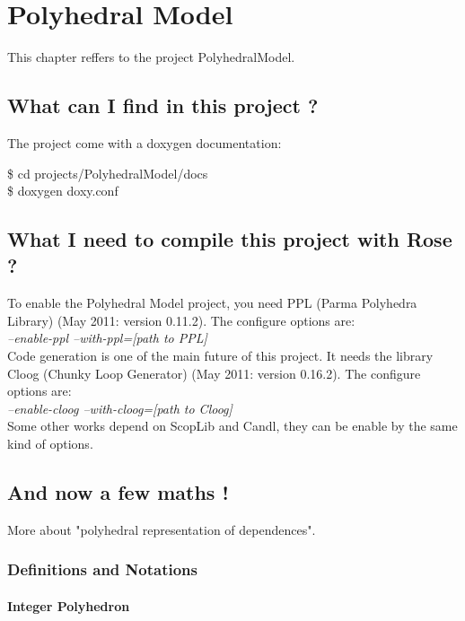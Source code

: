 \chapter{Polyhedral Model}
\label{polyhedric:polyhedric}

	This chapter reffers to the project PolyhedralModel.

	\section{What can I find in this project ?}
	\label{polyhedric:insideproject}
	
	The project come with a doxygen documentation:
	
	\$ cd projects/PolyhedralModel/docs \\
	\$ doxygen doxy.conf
	
	\section{What I need to compile this project with Rose ?}
	\label{polyhedric:getstarted}

	To enable the Polyhedral Model project, you need PPL (Parma Polyhedra Library) (May 2011: version 0.11.2). The configure options are: \\
	\emph{--enable-ppl --with-ppl=[path to PPL]}\\
	
	Code generation is one of the main future of this project. It needs the library Cloog (Chunky Loop Generator) (May 2011: version 0.16.2). The configure options are: \\
	\emph{--enable-cloog --with-cloog=[path to Cloog]}\\
	
	Some other works depend on ScopLib and Candl, they can be enable by the same kind of options.

	\section{And now a few maths !}
	\label{polyhedric:maths}

More about "polyhedral representation of dependences".

		\subsection{Definitions and Notations}
		\label{polyhedric:maths:defs}

			\subsubsection{Integer Polyhedron}
			\label{polyhedric:maths:defs:polyhedron}

